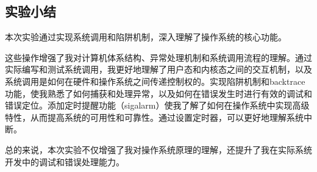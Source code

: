 \subsection{实验小结}
本次实验通过实现系统调用和陷阱机制，深入理解了操作系统的核心功能。

这些操作增强了我对计算机体系结构、异常处理机制和系统调用流程的理解。通过实际编写和测试系统调用，我更好地理解了用户态和内核态之间的交互机制，以及系统调用是如何在硬件和操作系统之间传递控制权的。实现陷阱机制和backtrace功能，使我熟悉了如何捕获和处理异常，以及如何在错误发生时进行有效的调试和错误定位。添加定时提醒功能（sigalarm）使我了解了如何在操作系统中实现高级特性，从而提高系统的可用性和可靠性。通过设置定时器，可以更好地理解系统中断。

总的来说，本次实验不仅增强了我对操作系统原理的理解，还提升了我在实际系统开发中的调试和错误处理能力。
